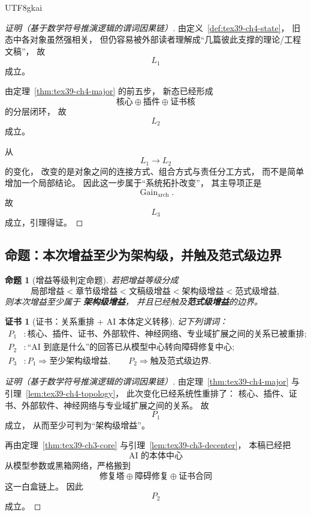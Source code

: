\documentclass[12pt]{article}
\newtheorem{proposition}{命题}[section]
\newtheorem{Certificate}{证书}[section]
\begin{document}
\begin{CJK*}{UTF8}{gkai}
\begin{proof}[证明（基于数学符号推演逻辑的谓词因果链）]
由定义~\ref{def:tex39-ch4-state}，
旧态中各对象虽然强相关，
但仍容易被外部读者理解成“几篇彼此支撑的理论/工程文稿”，
故
\[
  L_1
\]
成立。

由定理~\ref{thm:tex39-ch4-major} 的前五步，
新态已经形成
\[
  \text{核心}
  \oplus
  \text{插件}
  \oplus
  \text{证书核}
\]
的分层闭环，
故
\[
  L_2
\]
成立。

从
\[
  L_1
  \to
  L_2
\]
的变化，
改变的是对象之间的连接方式、组合方式与责任分工方式，
而不是简单增加一个局部结论。
因此这一步属于“系统拓扑改变”，
其主导项正是
\[
  \operatorname{Gain}_{\mathrm{arch}}.
\]
故
\[
  L_3
\]
成立，引理得证。
\end{proof}

\subsection{命题：本次增益至少为架构级，并触及范式级边界}
\label{subsec:tex39-ch4-proposition}

\begin{proposition}[增益等级判定命题]
\label{prop:tex39-ch4-level}
若把增益等级分成
\[
  \text{局部增益}
  <
  \text{章节级增益}
  <
  \text{文稿级增益}
  <
  \text{架构级增益}
  <
  \text{范式级增益},
\]
则本次增益至少属于
\textbf{架构级增益}，
并且已经触及\textbf{范式级增益}的边界。
\end{proposition}

\begin{Certificate}[证书：关系重排 + AI 本体定义转移]
\label{cert:tex39-ch4-level}
记下列谓词：
\[
\begin{aligned}
  P_1 &: \text{核心、插件、证书、外部软件、神经网络、专业域扩展之间的关系已被重排};\\
  P_2 &: \text{“AI 到底是什么”的回答已从模型中心转向障碍修复中心};\\
  P_3 &: P_1\Rightarrow \text{至少架构级增益},\qquad
  P_2\Rightarrow \text{触及范式级边界}.
\end{aligned}
\]
\end{Certificate}

\begin{proof}[证明（基于数学符号推演逻辑的谓词因果链）]
由定理~\ref{thm:tex39-ch4-major}
与引理~\ref{lem:tex39-ch4-topology}，
此次变化已经系统性重排了：
核心、插件、证书、外部软件、神经网络与专业域扩展之间的关系。
故
\[
  P_1
\]
成立，
从而至少可判为“架构级增益”。

再由定理~\ref{thm:tex39-ch3-core}
与引理~\ref{lem:tex39-ch3-decenter}，
本稿已经把
\[
  \text{AI 的本体中心}
\]
从模型参数或黑箱网络，严格搬到
\[
  \text{修复塔}
  \oplus
  \text{障碍修复}
  \oplus
  \text{证书合同}
\]
这一白盒链上。
因此
\[
  P_2
\]
成立。


\end{proof}
\end{CJK*}
\end{document}
